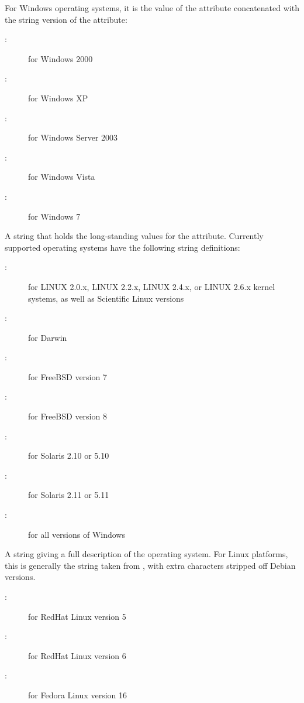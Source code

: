 \begin{description}
\begin{description}
	\end{description}
For Windows operating systems, it is the value of the  attribute 
concatenated with the string version of the  attribute:
	\begin{description}
	\item[:] for Windows 2000
	\item[:] for Windows XP
	\item[:] for Windows Server 2003
	\item[:] for Windows Vista
	\item[:] for Windows 7
	\end{description}
%
\item[\AdAttr{OpSysLegacy}:] A string that holds the long-standing values for the  attribute.
Currently supported operating systems have the following string
definitions:
	\begin{description}
	\item[:] for LINUX 2.0.x, LINUX 2.2.x, LINUX 2.4.x, or LINUX 2.6.x kernel systems, as well as Scientific Linux versions
	\item[:] for Darwin
	\item[:] for FreeBSD version 7
	\item[:] for FreeBSD version 8
	\item[:] for Solaris 2.10 or 5.10
	\item[:] for Solaris 2.11 or 5.11
	\item[:] for all versions of Windows
	\end{description}
%
\item[\AdAttr{OpSysLongName}:] A string giving a full description of 
the operating system.
For Linux platforms, this is generally the string taken from ,
with extra characters stripped off Debian versions.
	\begin{description}
	\item[:] for RedHat Linux version 5
	\item[:] for RedHat Linux version 6
	\item[:] for Fedora Linux version 16

\end{description}
\end{description}
